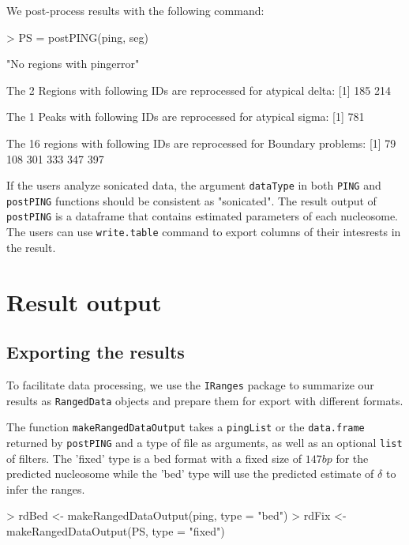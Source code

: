 \documentclass[11pt]{article}
\begin{document}
We post-process results with the following command:


\begin{Schunk}
\begin{Sinput}
> PS = postPING(ping, seg)
\end{Sinput}
\begin{Soutput}
[1] "No regions with pingerror"

 The 2 Regions with following IDs are reprocessed for atypical delta: 
[1] 185 214

 The 1 Peaks with following IDs are reprocessed for atypical sigma: 
[1] 781

 The 16 regions with following IDs are reprocessed for Boundary problems: 
[1]  79 108 301 333 347 397
\end{Soutput}
\end{Schunk}
If the users analyze sonicated data, the argument \texttt{dataType} in both \texttt{PING} and \texttt{postPING} functions should be consistent as "sonicated".
The result output of \texttt{postPING} is a dataframe that contains estimated parameters of each nucleosome. The users can use \texttt{write.table} command to export columns of their intesrests in the result. 



\section{Result output}

\subsection{Exporting the results}
To facilitate data processing, we use the \texttt{IRanges} package to
summarize our results as \texttt{RangedData} objects and prepare them for
export with different formats.


The function \texttt{makeRangedDataOutput} takes a \texttt{pingList} or the
\texttt{data.frame} returned by \texttt{postPING} and a type of file as arguments,
as well as an optional \texttt{list} of filters.
The 'fixed' type is a bed format with a fixed size of $147bp$ for the predicted nucleosome
while the 'bed' type will use the predicted estimate of $\delta$ to infer the ranges.
\begin{Schunk}
\begin{Sinput}
> rdBed <- makeRangedDataOutput(ping, type = "bed")
> rdFix <- makeRangedDataOutput(PS, type = "fixed")
\end{Sinput}
\end{Schunk}
\end{document}
